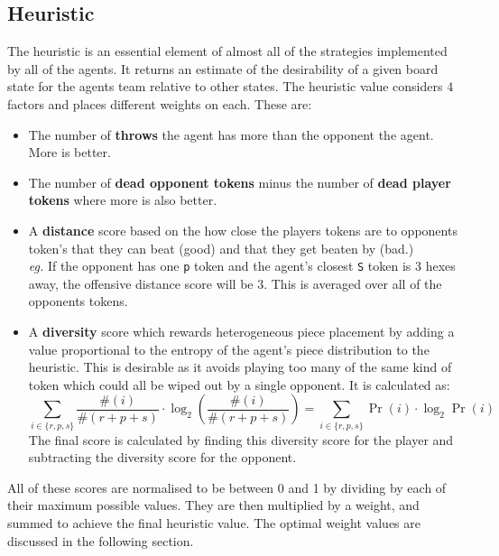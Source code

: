 \documentclass{article}
\begin{document}
\subsection{Heuristic}
\label{sec: Heuristic}
The heuristic is an essential element of almost all of the strategies implemented by all of the agents. It returns an estimate of the desirability of a given board state for the agents team relative to other states. The heuristic value considers 4 factors and places different weights on each. These are:
\begin{itemize}
    \item The number of \textbf{throws} the agent has more than the opponent the agent. More is better.
    \item The number of \textbf{dead opponent tokens} minus the number of \textbf{dead player tokens} where more is also better.
    \item A \textbf{distance} score based on the how close the players tokens are to opponents token's that they can beat (good) and that they get beaten by (bad.) \\[2mm]
    \textit{eg.} If the opponent has one \verb|p| token and the agent's closest \verb|S| token is 3 hexes away, the offensive distance score will be 3. This is averaged over all of the opponents tokens.
    \item A \textbf{diversity} score which rewards heterogeneous piece placement by adding a value proportional to the entropy of the agent's piece distribution to the heuristic. This is desirable as it avoids playing too many of the same kind of token which could all be wiped out by a single opponent. It is calculated as: $$\sum_{i\in\{r,p,s\}} \frac{\#(i)}{\#(r+p+s)} \cdot \log_2 \left( \frac{\#(i)}{\#(r+p+s)} \right) = \sum_{i\in\{r,p,s\}} \Pr(i) \cdot \log_2 \Pr(i)$$
    The final score is calculated by finding this diversity score for the player and subtracting the diversity score for the opponent.
\end{itemize}
All of these scores are normalised to be between 0 and 1 by dividing by each of their maximum possible values. They are then multiplied by a weight, and summed to achieve the final heuristic value. The optimal weight values are discussed in the following section.
\end{document}
